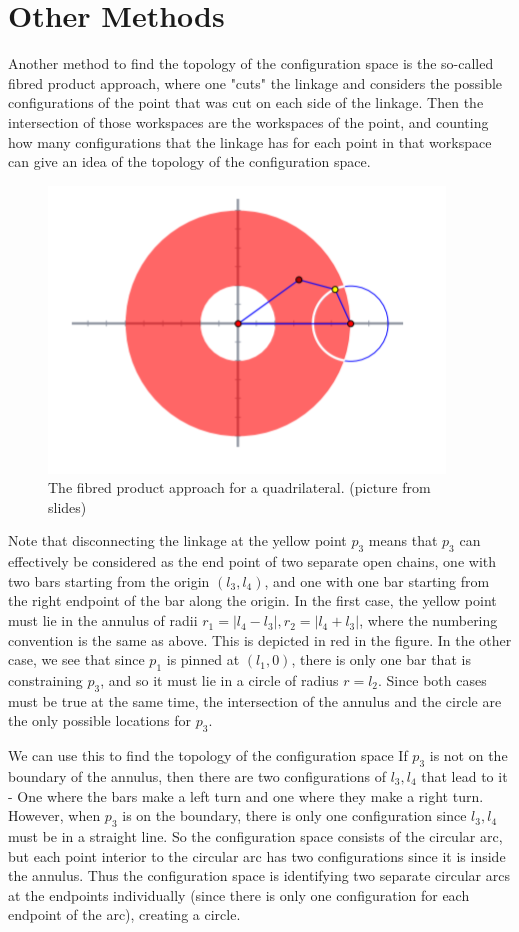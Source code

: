 \documentclass{article}
\begin{document}
\section{Other Methods}
Another method to find the topology of the configuration space is the so-called fibred product approach, where one "cuts" the linkage and considers the possible configurations of the point that was cut on each side of the linkage. Then the intersection of those workspaces are the workspaces of the point, and counting how many configurations that the linkage has for each point in that workspace can give an idea of the topology of the configuration space. 
\begin{figure}[!ht]
    \centering
    \includegraphics[scale=.5]{fibred.jpg}
    \caption{The fibred product approach for a quadrilateral. (picture from slides)}
    \label{fig:fibred}
\end{figure}\cite{spherical}
Note that disconnecting the linkage at the yellow point $p_3$ means that $p_3$ can effectively be considered as the end point of two separate open chains, one with two bars starting from the origin $(l_3, l_4)$, and one with one bar starting from the right endpoint of the bar along the origin. In the first case, the yellow point must lie in the annulus of radii $r_1 = |l_4 - l_3|, r_2 = |l_4 + l_3|$, where the numbering convention is the same as above. This is depicted in red in the figure. In the other case, we see that since $p_1$ is pinned at $(l_1, 0)$, there is only one bar that is constraining $p_3$, and so it must lie in a circle of radius $r = l_2$. Since both cases must be true at the same time, the intersection of the annulus and the circle are the only possible locations for $p_3$. 

We can use this to find the topology of the configuration space If $p_3$ is not on the boundary of the annulus, then there are two configurations of $l_3, l_4$ that lead to it - One where the bars make a left turn and one where they make a right turn. However, when $p_3$ is on the boundary, there is only one configuration since $l_3, l_4$ must be in a straight line. So the configuration space consists of the circular arc, but each point interior to the circular arc has two configurations since it is inside the annulus. Thus the configuration space is identifying two separate circular arcs at the endpoints individually (since there is only one configuration for each endpoint of the arc), creating a circle.
\end{document}
